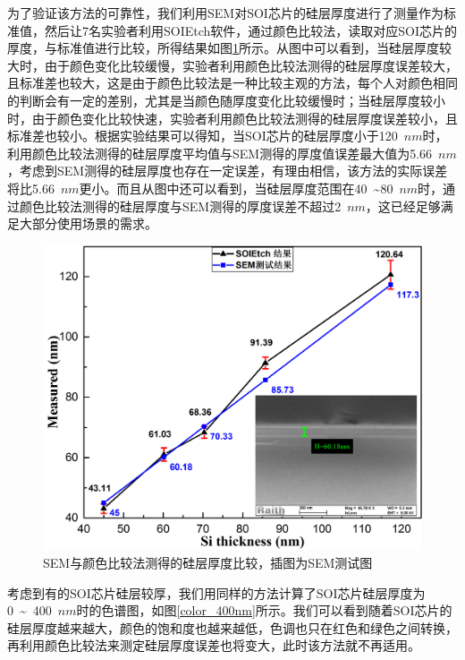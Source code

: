 为了验证该方法的可靠性，我们利用SEM对SOI芯片的硅层厚度进行了测量作为标准值，然后让7名实验者利用SOIEtch软件，通过颜色比较法，读取对应SOI芯片的厚度，与标准值进行比较，所得结果如图\ref{color_experiment_measure}所示。从图中可以看到，当硅层厚度较大时，由于颜色变化比较缓慢，实验者利用颜色比较法测得的硅层厚度误差较大，且标准差也较大，这是由于颜色比较法是一种比较主观的方法，每个人对颜色相同的判断会有一定的差别，尤其是当颜色随厚度变化比较缓慢时；当硅层厚度较小时，由于颜色变化比较快速，实验者利用颜色比较法测得的硅层厚度误差较小，且标准差也较小。根据实验结果可以得知，当SOI芯片的硅层厚度小于120~$nm$时，利用颜色比较法测得的硅层厚度平均值与SEM测得的厚度值误差最大值为5.66~$nm$，考虑到SEM测得的硅层厚度也存在一定误差，有理由相信，该方法的实际误差将比5.66~$nm$更小。而且从图中还可以看到，当硅层厚度范围在40~\~{}80~$nm$时，通过颜色比较法测得的硅层厚度与SEM测得的厚度误差不超过2~$nm$，这已经足够满足大部分使用场景的需求。

\begin{figure}[htb]
	\centering
	\includegraphics[width=13cm]{./Pictures/color_experiment_measure.jpg}
	\captionsetup{justification=centering}
	\caption{SEM与颜色比较法测得的硅层厚度比较，插图为SEM测试图}
	\label{color_experiment_measure}
\end{figure}

考虑到有的SOI芯片硅层较厚，我们用同样的方法计算了SOI芯片硅层厚度为0~\~{}~400~$nm$时的色谱图，如图\ref{color_400nm}所示。我们可以看到随着SOI芯片的硅层厚度越来越大，颜色的饱和度也越来越低，色调也只在红色和绿色之间转换，再利用颜色比较法来测定硅层厚度误差也将变大，此时该方法就不再适用。

